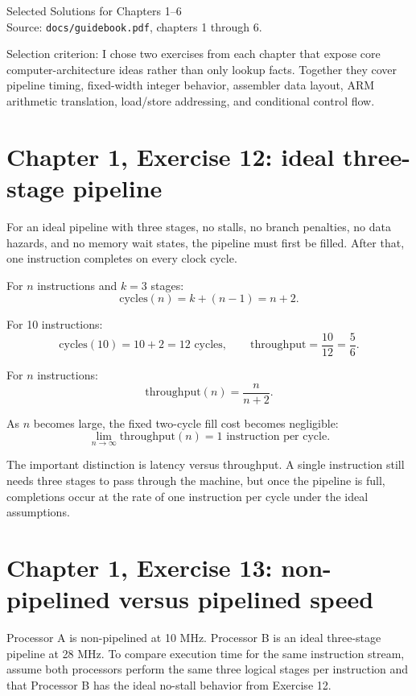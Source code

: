 \documentclass[11pt]{article}
\newcommand{\code}[1]{\texttt{#1}}
\begin{document}
\begin{center}
{\Large Selected Solutions for Chapters 1--6}\\
\vspace{0.25em}
Source: \code{docs/guidebook.pdf}, chapters 1 through 6.
\end{center}

Selection criterion: I chose two exercises from each chapter that expose core computer-architecture ideas rather than only lookup facts. Together they cover pipeline timing, fixed-width integer behavior, assembler data layout, ARM arithmetic translation, load/store addressing, and conditional control flow.

\section*{Chapter 1, Exercise 12: ideal three-stage pipeline}

For an ideal pipeline with three stages, no stalls, no branch penalties, no data hazards, and no memory wait states, the pipeline must first be filled. After that, one instruction completes on every clock cycle.

For \(n\) instructions and \(k = 3\) stages:
\[
\mathrm{cycles}(n) = k + (n - 1) = n + 2.
\]

For 10 instructions:
\[
\mathrm{cycles}(10) = 10 + 2 = 12 \text{ cycles},
\qquad
\mathrm{throughput} = \frac{10}{12} = \frac{5}{6}.
\]

For \(n\) instructions:
\[
\mathrm{throughput}(n) = \frac{n}{n + 2}.
\]

As \(n\) becomes large, the fixed two-cycle fill cost becomes negligible:
\[
\lim_{n \to \infty}\mathrm{throughput}(n) = 1 \text{ instruction per cycle}.
\]

The important distinction is latency versus throughput. A single instruction still needs three stages to pass through the machine, but once the pipeline is full, completions occur at the rate of one instruction per cycle under the ideal assumptions.

\section*{Chapter 1, Exercise 13: non-pipelined versus pipelined speed}

Processor A is non-pipelined at 10 MHz. Processor B is an ideal three-stage pipeline at 28 MHz. To compare execution time for the same instruction stream, assume both processors perform the same three logical stages per instruction and that Processor B has the ideal no-stall behavior from Exercise 12.
\end{document}
